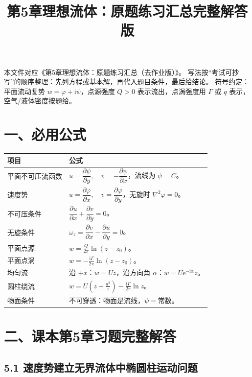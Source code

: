 \documentclass[UTF8,zihao=-4]{ctexart}
\title{\bfseries 第5章理想流体：原题练习汇总完整解答版}
\author{}
\date{}
\newcommand{\ii}{\mathrm i}
\newcommand{\e}{\mathrm e}
\begin{document}
\maketitle

本文件对应《第5章理想流体：原题练习汇总（去作业版）》。
写法按“考试可抄写”的顺序整理：先列方程或基本解，再代入题目条件，最后给结论。
符号约定：平面流动复势 \(w=\varphi+\ii\psi\)，点源强度 \(Q>0\) 表示流出，点涡强度用 \(\Gamma\) 或 \(q\) 表示，空气/液体密度按题给。

\section*{一、必用公式}

\begin{longtable}{p{3.2cm}p{11.5cm}}
\toprule
项目 & 公式 \\
\midrule
平面不可压流函数 & \(u=\dfrac{\partial \psi}{\partial y},\quad v=-\dfrac{\partial \psi}{\partial x}\)，流线为 \(\psi=C\)。\\
速度势 & \(u=\dfrac{\partial \varphi}{\partial x},\quad v=\dfrac{\partial \varphi}{\partial y}\)，无旋时 \(\nabla^2\varphi=0\)。\\
不可压条件 & \(\dfrac{\partial u}{\partial x}+\dfrac{\partial v}{\partial y}=0\)。\\
无旋条件 & \(\omega_z=\dfrac{\partial v}{\partial x}-\dfrac{\partial u}{\partial y}=0\)。\\
平面点源 & \(\displaystyle w=\frac{Q}{2\pi}\ln(z-z_0)\)。\\
平面点涡 & \(\displaystyle w=-\frac{\ii\Gamma}{2\pi}\ln(z-z_0)\)。\\
均匀流 & 沿 \(+x\)：\(w=Uz\)，沿方向角 \(\alpha\)：\(w=U\e^{-\ii\alpha}z\)。\\
圆柱绕流 & \(\displaystyle w=U\left(z+\frac{a^2}{z}\right)-\frac{\ii\Gamma}{2\pi}\ln z\)。\\
物面条件 & 不可穿透：物面是流线，\(\psi=\text{常数}\)。\\
\bottomrule
\end{longtable}

\section*{二、课本第5章习题完整解答}

\subsection*{5.1 速度势建立无界流体中椭圆柱运动问题}
\end{document}
